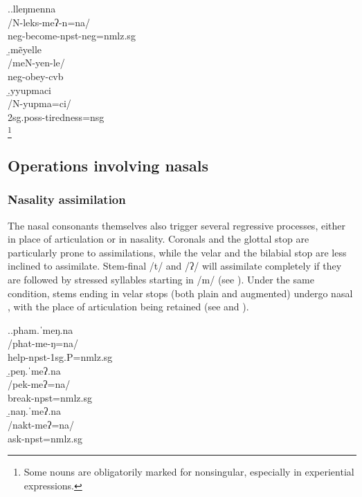 \ex.\a.\glll lleŋmenna\\
		/N-leks-meʔ-n=na/\\
		{\sc neg-}become{\sc [3sg]-npst-neg=nmlz.sg}\\
		\b.\glll mẽyelle\\
		/meN-yen-le/\\
		{\sc neg-}obey{\sc -cvb}\\
		\b.\glll yyupmaci\\
		/N-yupma=ci/\\
		{\sc 2sg.poss-}tiredness{\sc =nsg}\\
		\footnote{Some nouns are obligatorily marked for nonsingular, especially in experiential expressions.}


\subsection{Operations involving nasals}\label{nas-strat}			

\subsubsection{Nasality  assimilation}
		
The nasal consonants themselves also trigger several regressive  processes, either in place of articulation or in nasality. Coronals and the glottal stop are particularly prone to assimilations, while the velar and the bilabial stop are less inclined to assimilate. Stem-final /t/ and /ʔ/ will assimilate completely if they are followed by stressed syllables starting in /m/ (see \Next[a]). Under the same condition, stems ending in velar stops (both plain and augmented) undergo nasal ,  with the place of articulation being retained (see \Next[b] and \Next[c]).

\ex.\a.\glll pham.ˈmeŋ.na\\
/phat-me-ŋ=na/\\
help{\sc [3sg.A]-npst-1sg.P=nmlz.sg}\\
\b.\glll  peŋ.ˈmeʔ.na\\
/pek-meʔ=na/\\
break{\sc [3sg]-npst=nmlz.sg}\\
\b.\glll  naŋ.ˈmeʔ.na\\
/nakt-meʔ=na/\\
ask{\sc [3sg]-npst=nmlz.sg}\\


